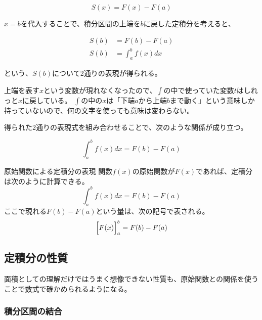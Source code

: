 \documentclass[../math-imaging]{subfiles}
\begin{document}
\begin{equation}
  S(x) = F(x) - F(a)
\end{equation}

$x=b$を代入することで、積分区間の上端を$b$に戻した定積分を考えると、

\begin{align}
  S(b) & = F(b) - F(a)        \\
  S(b) & = \int_{a}^{b}f(x)dx
\end{align}

という、$S(b)$について2通りの表現が得られる。

\begin{supplnote}
  上端を表す$x$という変数が現れなくなったので、$\int$の中で使っていた変数$t$はしれっと$x$に戻している。
  $\int$の中の$x$は「下端$a$から上端$b$まで動く」という意味しか持っていないので、何の文字を使っても意味は変わらない。
\end{supplnote}

得られた2通りの表現式を組み合わせることで、次のような関係が成り立つ。

\begin{equation}
  \int_{a}^{b}f(x)dx = F(b) - F(a)
\end{equation}

\begin{theorem}{原始関数による定積分の表現}
  \newline
  関数$f(x)$の原始関数が$F(x)$であれば、定積分は次のように計算できる。
  \LARGE
  \begin{equation}
    \int_{a}^{b}f(x)dx = F(b) - F(a)
  \end{equation}
  \normalsize
  ここで現れる$F(b) - F(a)$という量は、次の記号で表される。
  \LARGE
  \begin{equation}
    \Bigl[ F(x) \Bigr]_{a}^{b} = F(b) - F(a)
  \end{equation}
\end{theorem}

\subsection{定積分の性質}

面積としての理解だけではうまく想像できない性質も、原始関数との関係を使うことで数式で確かめられるようになる。

\subsubsection{積分区間の結合}
\end{document}
